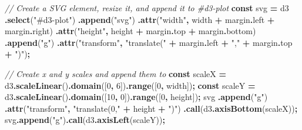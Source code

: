 \documentclass[
]{book}
\newenvironment{Shaded}{\begin{snugshade}}{\end{snugshade}}
\newcommand{\AttributeTok}[1]{\textcolor[rgb]{0.13,0.29,0.53}{#1}}
\newcommand{\CommentTok}[1]{\textcolor[rgb]{0.56,0.35,0.01}{\textit{#1}}}
\newcommand{\DecValTok}[1]{\textcolor[rgb]{0.00,0.00,0.81}{#1}}
\newcommand{\FunctionTok}[1]{\textcolor[rgb]{0.13,0.29,0.53}{\textbf{#1}}}
\newcommand{\KeywordTok}[1]{\textcolor[rgb]{0.13,0.29,0.53}{\textbf{#1}}}
\newcommand{\NormalTok}[1]{#1}
\newcommand{\OperatorTok}[1]{\textcolor[rgb]{0.81,0.36,0.00}{\textbf{#1}}}
\newcommand{\StringTok}[1]{\textcolor[rgb]{0.31,0.60,0.02}{#1}}
\begin{document}
\begin{Shaded}
\begin{Highlighting}[]
\CommentTok{// Create a SVG element, resize it, and append it to \#d3{-}plot}
\KeywordTok{const}\NormalTok{ svg }\OperatorTok{=}\NormalTok{ d3}
  \OperatorTok{.}\FunctionTok{select}\NormalTok{(}\StringTok{"\#d3{-}plot"}\NormalTok{)}
  \OperatorTok{.}\FunctionTok{append}\NormalTok{(}\StringTok{"svg"}\NormalTok{)}
  \OperatorTok{.}\FunctionTok{attr}\NormalTok{(}\StringTok{"width"}\OperatorTok{,}\NormalTok{ width }\OperatorTok{+}\NormalTok{ margin}\OperatorTok{.}\AttributeTok{left} \OperatorTok{+}\NormalTok{ margin}\OperatorTok{.}\AttributeTok{right}\NormalTok{)}
  \OperatorTok{.}\FunctionTok{attr}\NormalTok{(}\StringTok{"height"}\OperatorTok{,}\NormalTok{ height }\OperatorTok{+}\NormalTok{ margin}\OperatorTok{.}\AttributeTok{top} \OperatorTok{+}\NormalTok{ margin}\OperatorTok{.}\AttributeTok{bottom}\NormalTok{)}
  \OperatorTok{.}\FunctionTok{append}\NormalTok{(}\StringTok{"g"}\NormalTok{)}
  \OperatorTok{.}\FunctionTok{attr}\NormalTok{(}\StringTok{"transform"}\OperatorTok{,} \StringTok{"translate("} \OperatorTok{+}\NormalTok{ margin}\OperatorTok{.}\AttributeTok{left} \OperatorTok{+} \StringTok{","} \OperatorTok{+}\NormalTok{ margin}\OperatorTok{.}\AttributeTok{top} \OperatorTok{+} \StringTok{")"}\NormalTok{)}\OperatorTok{;}

\CommentTok{// Create x and y scales and append them to}
\KeywordTok{const}\NormalTok{ scaleX }\OperatorTok{=}\NormalTok{ d3}\OperatorTok{.}\FunctionTok{scaleLinear}\NormalTok{()}\OperatorTok{.}\FunctionTok{domain}\NormalTok{([}\DecValTok{0}\OperatorTok{,} \DecValTok{6}\NormalTok{])}\OperatorTok{.}\FunctionTok{range}\NormalTok{([}\DecValTok{0}\OperatorTok{,}\NormalTok{ width])}\OperatorTok{;}
\KeywordTok{const}\NormalTok{ scaleY }\OperatorTok{=}\NormalTok{ d3}\OperatorTok{.}\FunctionTok{scaleLinear}\NormalTok{()}\OperatorTok{.}\FunctionTok{domain}\NormalTok{([}\DecValTok{10}\OperatorTok{,} \DecValTok{0}\NormalTok{])}\OperatorTok{.}\FunctionTok{range}\NormalTok{([}\DecValTok{0}\OperatorTok{,}\NormalTok{ height])}\OperatorTok{;}
\NormalTok{svg}
  \OperatorTok{.}\FunctionTok{append}\NormalTok{(}\StringTok{"g"}\NormalTok{)}
  \OperatorTok{.}\FunctionTok{attr}\NormalTok{(}\StringTok{"transform"}\OperatorTok{,} \StringTok{"translate(0,"} \OperatorTok{+}\NormalTok{ height }\OperatorTok{+} \StringTok{")"}\NormalTok{)}
  \OperatorTok{.}\FunctionTok{call}\NormalTok{(d3}\OperatorTok{.}\FunctionTok{axisBottom}\NormalTok{(scaleX))}\OperatorTok{;}
\NormalTok{svg}\OperatorTok{.}\FunctionTok{append}\NormalTok{(}\StringTok{"g"}\NormalTok{)}\OperatorTok{.}\FunctionTok{call}\NormalTok{(d3}\OperatorTok{.}\FunctionTok{axisLeft}\NormalTok{(scaleY))}\OperatorTok{;}


\end{Highlighting}
\end{Shaded}
\end{document}
